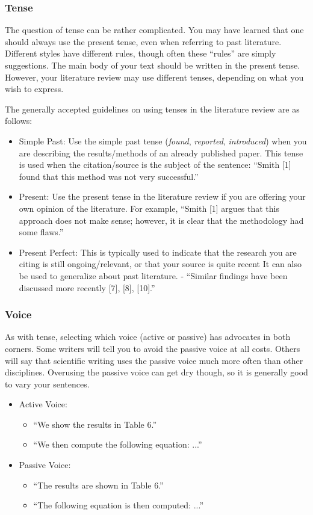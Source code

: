 \subsubsection{Tense}
The question of tense can be rather complicated. You may have learned that one should always use the present tense, even when referring to past literature. Different styles have different rules, though often these ``rules'' are simply suggestions. The main body of your text should be written in the present tense. However, your literature review may use different tenses, depending on what you wish to express.

The generally accepted guidelines on using tenses in the literature review are as follows:
\begin{itemize}
	\item Simple Past: Use the simple past tense (\textit{found}, \textit{reported}, \textit{introduced}) when you are describing the results/methods of an already published paper. This tense is used when the citation/source is the subject of the sentence: ``Smith [1] found that this method was not very successful.''
	\item Present: Use the present tense in the literature review if you are offering your own opinion of the literature. For example, ``Smith [1] argues that this approach does not make sense; however, it is clear that the methodology had some flaws.''
	\item Present Perfect: This is typically used to indicate that the research you are citing is still ongoing/relevant, or that your source is quite recent It can also be used to generalize about past literature. - ``Similar findings have been discussed more recently [7], [8], [10].''
\end{itemize}

\subsubsection{Voice}
As with tense, selecting which voice (active or passive) has advocates in both corners. Some writers will tell you to avoid the passive voice at all costs. Others will say that scientific writing uses the passive voice much more often than other disciplines. Overusing the passive voice can get dry though, so it is generally good to vary your sentences.

\begin{itemize}
	\item Active Voice: 
	\begin{itemize}
		\item ``We show the results in Table 6.''
		\item ``We then compute the following equation: ...''
	\end{itemize}
\item Passive Voice:
\begin{itemize}
\item ``The results are shown in Table 6.''
\item ``The following equation is then computed: ...''
\end{itemize}
\end{itemize}

